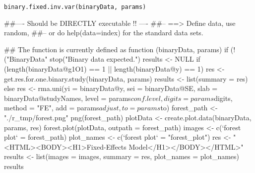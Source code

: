 \begin{Usage}
\begin{verbatim}
binary.fixed.inv.var(binaryData, params)
\end{verbatim}
\end{Usage}
\begin{Arguments}
\begin{ldescription}
\item[\code{binaryData}] 
\item[\code{params}] 
\end{ldescription}
\end{Arguments}
\begin{Examples}
\begin{ExampleCode}
##---- Should be DIRECTLY executable !! ----
##-- ==>  Define data, use random,
##--    or do  help(data=index)  for the standard data sets.

## The function is currently defined as
function (binaryData, params) 
{
    if (!("BinaryData" %
        stop("Binary data expected.")
    results <- NULL
    if (length(binaryData@g1O1) == 1 || length(binaryData@y) == 
        1) {
        res <- get.res.for.one.binary.study(binaryData, params)
        results <- list(summary = res)
    }
    else {
        res <- rma.uni(yi = binaryData@y, sei = binaryData@SE, 
            slab = binaryData@studyNames, level = params$conf.level, 
            digits = params$digits, method = "FE", add = params$adjust, 
            to = params$to)
        forest_path <- "./r_tmp/forest.png"
        png(forest_path)
        plotData <- create.plot.data(binaryData, params, res)
        forest.plot(plotData, outpath = forest_path)
        images <- c(`forest plot` = forest_path)
        plot_names <- c(`forest plot` = "forest_plot")
        res <- "<HTML><BODY><H1>Fixed-Effects Model</H1></BODY></HTML>"
        results <- list(images = images, summary = res, plot_names = plot_names)
    }
    results
  }
\end{ExampleCode}
\end{Examples}

